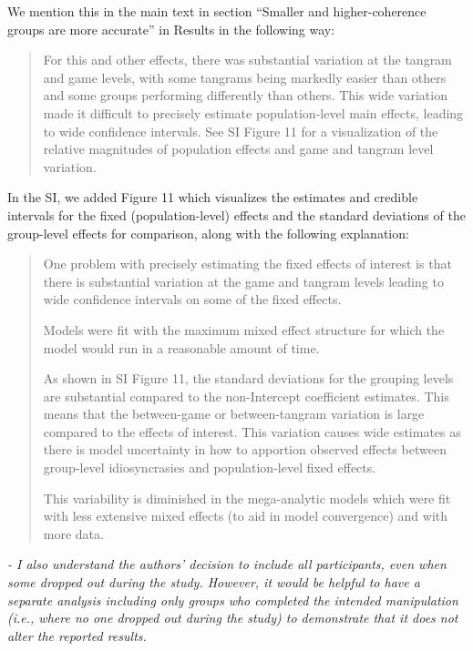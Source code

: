 \documentclass{stanfordletter}
\newcommand{\theysaid}[1]{\begin{leftbar} \noindent 
		\textsl{ #1}\end{leftbar}}
\newcommand{\revised}[1]{\begin{quote}	#1 \end{quote}}
\begin{document}
\begin{letter}{}
          We mention this in the main text in section ``Smaller and higher-coherence groups are more accurate'' in Results in the following way: 
          \revised{For this and other effects, there was substantial variation at the tangram and game levels, with some tangrams being markedly easier than others and some groups performing differently than others. This wide variation made it difficult to precisely estimate population-level main effects, leading to wide confidence intervals. See SI Figure 11 for a visualization of the relative magnitudes of population effects and game and tangram level variation.}
          
          In the SI, we added Figure 11 which visualizes the estimates and credible intervals for the fixed (population-level) effects and the standard deviations of the group-level effects for comparison, along with the following explanation: 
          
          \revised{One problem with precisely estimating the fixed effects of interest is that there is substantial variation at the game and tangram levels leading to wide confidence intervals on some of the fixed effects.
          	
          	Models were fit with the maximum mixed effect structure for which the model would run in a reasonable amount of time. 
          	
          	As shown in SI Figure 11, the standard deviations for the grouping levels are substantial compared to the non-Intercept coefficient estimates. This means that the between-game or between-tangram variation is large compared to the effects of interest. This variation causes wide estimates as there is model uncertainty in how to apportion observed effects between group-level idiosyncrasies and population-level fixed effects.
          	
          	This variability is diminished in the mega-analytic models which were fit with less extensive mixed effects (to aid in model convergence) and with more data. }

          
          

          
          \theysaid{- I also understand the authors' decision to include all participants, even when some dropped out during the study. However, it would be helpful to have a separate analysis including only groups who completed the intended manipulation (i.e., where no one dropped out during the study) to demonstrate that it does not alter the reported results.}
          

\end{letter}
\end{document}
